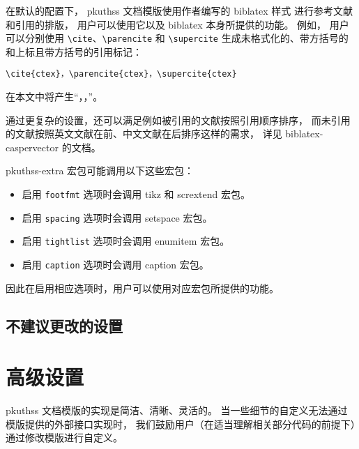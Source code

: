 		在默认的配置下，%
		pkuthss 文档模版使用作者编写的 %
		biblatex\supercite{biblatex} 样式\supercite{biblatex-caspervector}%
		进行参考文献和引用的排版，
		用户可以使用它以及 biblatex 本身所提供的功能。
		例如，
		用户可以分别使用 \verb|\cite|、\verb|\parencite| 和 \verb|\supercite| %
		生成未格式化的、带方括号的和上标且带方括号的引用标记：
\begin{Verbatim}[frame = single]
\cite{ctex}，\parencite{ctex}，\supercite{ctex}
\end{Verbatim}
		在本文中将产生“\cite{ctex}，\parencite{ctex}，\supercite{ctex}”。

		通过更复杂的设置，还可以满足例如被引用的文献按照引用顺序排序，
		而未引用的文献按照英文文献在前、中文文献在后排序这样的需求，
		详见 biblatex-caspervector 的文档\supercite{biblatex-caspervector}。

		pkuthss-extra 宏包可能调用以下这些宏包：
		\begin{itemize}
			\item 启用 \verb|footfmt| 选项时会调用 %
				tikz\supercite{tikz} 和 scrextend\supercite{scrextend} 宏包。
			\item 启用 \verb|spacing| 选项时会调用 setspace 宏包。
			\item 启用 \verb|tightlist| 选项时会调用 %
				enumitem\supercite{enumitem} 宏包。
			\item 启用 \verb|caption| 选项时会调用 %
				caption\supercite{caption} 宏包。
		\end{itemize}
		因此在启用相应选项时，用户可以使用对应宏包所提供的功能。

		\subsection{不建议更改的设置}

	\section{高级设置}\label{sec:advanced}

	pkuthss 文档模版的实现是简洁、清晰、灵活的。
	当一些细节的自定义无法通过模版提供的外部接口实现时，
	我们鼓励用户（在适当理解相关部分代码的前提下）通过修改模版进行自定义。

